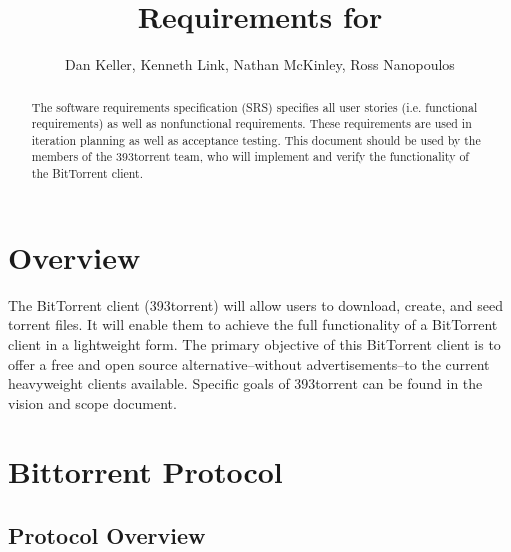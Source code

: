 \documentclass[letter]{scrartcl}
\newcommand{\app}{\sc{393torrent}}
\begin{document}
\title{Requirements for \app}
\subtitle{Dan Keller, Kenneth Link, Nathan McKinley, Ross Nanopoulos}
\date{} %

\maketitle

\begin{abstract}

The software requirements specification (SRS) specifies all user stories (i.e. functional requirements) as well as nonfunctional requirements. These requirements are used in iteration planning as well as acceptance testing.  This document should be used by the members of the 393torrent team, who will implement and verify the functionality of the BitTorrent client.
\end{abstract}

\tableofcontents
\pagebreak

\section{Overview}
The BitTorrent client (393torrent) will allow users to download, create, and seed torrent files.  It will enable them to achieve the full functionality of a BitTorrent client in a lightweight form.  The primary objective of this BitTorrent client is to offer a free and open source alternative--without advertisements--to the current heavyweight clients available.  Specific goals of 393torrent can be found in the vision and scope document.

\section{Bittorrent Protocol}

\subsection{Protocol Overview}
	
\end{document}
